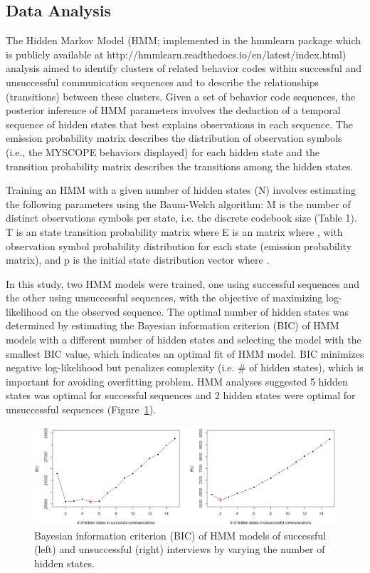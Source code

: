 \subsection{Data Analysis}
\label{subsec:dataanalysis}
The Hidden Markov Model (HMM; implemented in the hmmlearn package which is publicly available at http://hmmlearn.readthedocs.io/en/latest/index.html) analysis aimed to identify clusters of related behavior codes within successful and unsuccessful communication sequences and to describe the relationships (transitions) between these clusters. Given a set of behavior code sequences, the posterior inference of HMM parameters involves the deduction of a temporal sequence of hidden states that best explains observations in each sequence. The emission probability matrix describes the distribution of observation symbols (i.e., the MYSCOPE behaviors displayed) for each hidden state and the transition probability matrix describes the transitions among the hidden states.

Training an HMM with a given number of hidden states (N) involves estimating the following parameters using the Baum-Welch algorithm:
M is the number of distinct observations symbols per state, i.e. the discrete codebook size (Table 1).
T is an  state transition probability matrix where  
E is an  matrix where , with observation symbol probability distribution for each state (emission probability matrix), and
p is the initial state distribution vector where .

In this study, two HMM models were trained, one using successful sequences and the other using unsuccessful sequences, with the objective of maximizing log-likelihood on the observed sequence. The optimal number of hidden states was determined by estimating the Bayesian information criterion (BIC) of HMM models with a different number of hidden states and selecting the model with the smallest BIC value, which indicates an optimal fit of HMM model. BIC minimizes negative log-likelihood but penalizes complexity (i.e. \# of hidden states), which is important for avoiding overfitting problem. HMM analyses suggested 5 hidden states was optimal for successful sequences and 2 hidden states were optimal for unsuccessful sequences (Figure~\ref{fig:bic}). 

\begin{figure}
\includegraphics[width=1.0\textwidth]{figures/bic-vs-hidden-states.eps}
\caption{Bayesian information criterion (BIC) of HMM models of successful (left) and unsuccessful (right) interviews by varying the number of hidden states.}
\label{fig:bic}
\end{figure}

